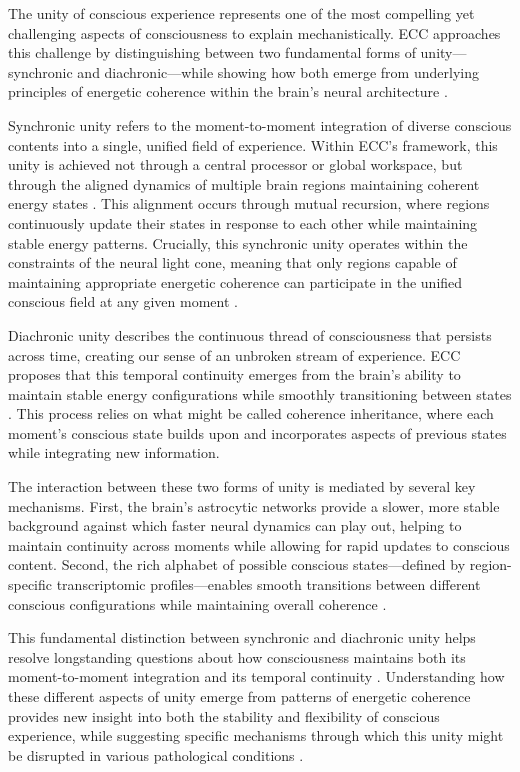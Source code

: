 \begin{refsection}
The unity of conscious experience represents one of the most compelling yet challenging aspects of consciousness to explain mechanistically. ECC approaches this challenge by distinguishing between two fundamental forms of unity—synchronic and diachronic—while showing how both emerge from underlying principles of energetic coherence within the brain's neural architecture \cite{engel2001temporal}.

Synchronic unity refers to the moment-to-moment integration of diverse conscious contents into a single, unified field of experience. Within ECC's framework, this unity is achieved not through a central processor or global workspace, but through the aligned dynamics of multiple brain regions maintaining coherent energy states \cite{singer1999neuronal}. This alignment occurs through mutual recursion, where regions continuously update their states in response to each other while maintaining stable energy patterns. Crucially, this synchronic unity operates within the constraints of the neural light cone, meaning that only regions capable of maintaining appropriate energetic coherence can participate in the unified conscious field at any given moment \cite{gray1999temporal}.

Diachronic unity describes the continuous thread of consciousness that persists across time, creating our sense of an unbroken stream of experience. ECC proposes that this temporal continuity emerges from the brain's ability to maintain stable energy configurations while smoothly transitioning between states \cite{honey2012slow}. This process relies on what might be called coherence inheritance, where each moment's conscious state builds upon and incorporates aspects of previous states while integrating new information.

The interaction between these two forms of unity is mediated by several key mechanisms. First, the brain's astrocytic networks provide a slower, more stable background against which faster neural dynamics can play out, helping to maintain continuity across moments while allowing for rapid updates to conscious content. Second, the rich alphabet of possible conscious states—defined by region-specific transcriptomic profiles—enables smooth transitions between different conscious configurations while maintaining overall coherence \cite{womelsdorf2007modulation}.

This fundamental distinction between synchronic and diachronic unity helps resolve longstanding questions about how consciousness maintains both its moment-to-moment integration and its temporal continuity \cite{vanrullen2003perception}. Understanding how these different aspects of unity emerge from patterns of energetic coherence provides new insight into both the stability and flexibility of conscious experience, while suggesting specific mechanisms through which this unity might be disrupted in various pathological conditions \cite{fell2011role}.


\end{refsection}
